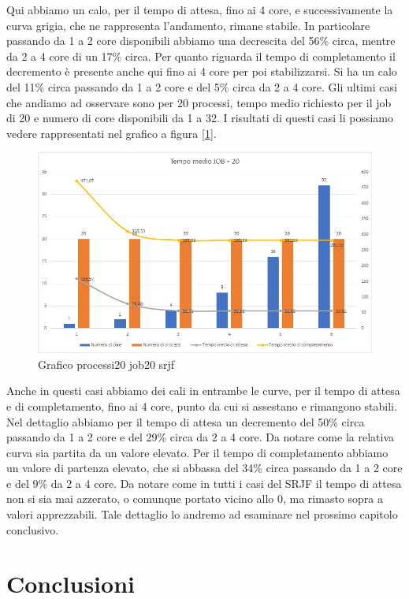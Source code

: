 \documentclass[Lau, oneside]{sapthesis}%
\begin{document}
Qui abbiamo un calo, per il tempo di attesa, fino ai 4 core, e successivamente la curva grigia, che ne rappresenta l'andamento, rimane stabile.
In particolare passando da 1 a 2 core disponibili abbiamo una decrescita del 56\% circa, mentre da 2 a 4 core di un 17\% circa.
Per quanto riguarda il tempo di completamento il decremento è presente anche qui fino ai 4 core per poi stabilizzarsi.
Si ha un calo del 11\% circa passando da 1 a 2 core e del 5\% circa da 2 a 4 core.
Gli ultimi casi che andiamo ad osservare sono per 20 processi, tempo medio richiesto per il job di 20 e numero di core disponibili da 1 a 32.
I risultati di questi casi li possiamo vedere rappresentati nel grafico a figura \hyperref[figura:p20j20srjf]{[\ref*{figura:p20j20srjf}]}.
\begin{figure}[ht!]
  \centering
  \includegraphics[width=1\textwidth]{Grafico processi20job20 srjf.jpg}
  \caption{Grafico processi20 job20 srjf}
  \label{figura:p20j20srjf}
\end{figure}
Anche in questi casi abbiamo dei cali in entrambe le curve, per il tempo di attesa e di completamento, fino ai 4 core, punto da cui si assestano e rimangono stabili.
Nel dettaglio abbiamo per il tempo di attesa un decremento del 50\% circa passando da 1 a 2 core e del 29\% circa da 2 a 4 core.
Da notare come la relativa curva sia partita da un valore elevato.
Per il tempo di completamento abbiamo un valore di partenza elevato, che si abbassa del 34\% circa passando da 1 a 2 core e del 9\% da 2 a 4 core.
Da notare come in tutti i casi del SRJF il tempo di attesa non si sia mai azzerato, o comunque portato vicino allo 0, ma rimasto sopra a valori apprezzabili.
Tale dettaglio lo andremo ad esaminare nel prossimo capitolo conclusivo.

\chapter{Conclusioni}
\label{chap:4}
\end{document}
